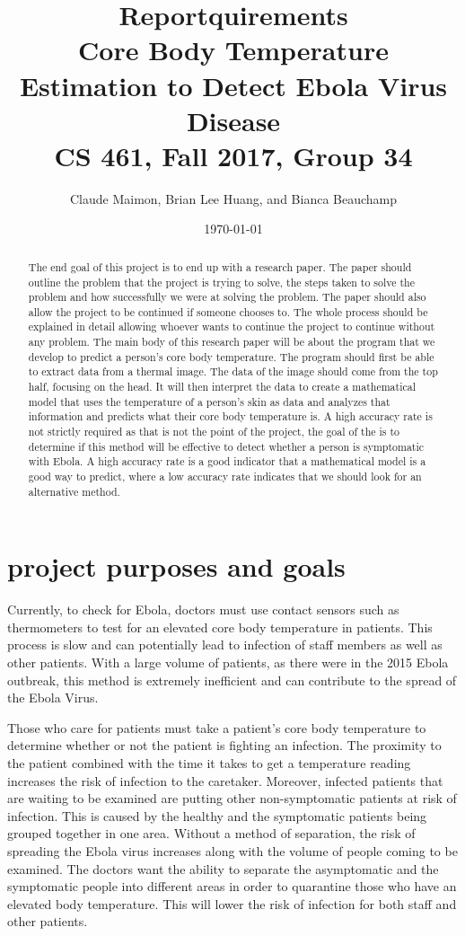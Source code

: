 \documentclass[onecolumn, draftclsnofoot,10pt, compsoc]{IEEEtran}
\title{%
  Reportquirements \\
  \vspace{0.4cm}
  \large Core Body Temperature Estimation to Detect Ebola Virus Disease \\
  \vspace{0.4cm}
  \large CS 461, Fall 2017, Group 34\\
    }
\author{Claude Maimon, Brian Lee Huang, and Bianca Beauchamp}
\date{\today}
\begin{document}
\maketitle

\begin{abstract}
	The end goal of this project is to end up with a research paper. The paper should outline the problem that the project is trying to solve, the steps taken to solve the problem and how successfully we were
	at solving the problem. The paper should also allow the project to be continued if someone chooses to. The whole process should be explained in detail allowing whoever wants to continue the
	project to continue without any problem. The main body of this research paper will be about the program that we develop to predict a person's core body temperature. The program should first be able to
	extract data from a thermal image. The data of the image should come from the top half, focusing on the head. It will then interpret the data to create a mathematical model that uses the temperature of a 
	person's skin as data and analyzes that information and predicts what their core body temperature is. A high accuracy rate is not strictly required as that is not the point of the project, 
	the goal of the is to determine if this method will be effective to detect whether a person is symptomatic with Ebola. A high accuracy rate is a good indicator that a mathematical model
	is a good way to predict, where a low accuracy rate indicates that we should look for an alternative method.
\end{abstract}

\newpage

\tableofcontents
\newpage
\section{project purposes and goals}
Currently, to check for Ebola, doctors must use contact sensors such as thermometers to test for an elevated core body temperature in patients. This process is slow and can potentially lead to infection of staff members as well as other patients. With a large volume of patients, as there were in the 2015 Ebola outbreak, this method is extremely inefficient and can contribute to the spread of the Ebola Virus.

Those who care for patients must take a patient’s core body temperature to determine whether or not the patient is fighting an infection. The proximity to the patient combined with the time it takes to get a temperature reading increases the risk of infection to the caretaker. Moreover, infected patients that are waiting to be examined are putting other non-symptomatic patients at risk of infection. This is caused by the healthy and the symptomatic patients being grouped together in one area. Without a method of separation, the risk of spreading the Ebola virus increases along with the volume of people coming to be examined. The doctors want the ability to separate the asymptomatic and the symptomatic people into different areas in order to quarantine those who have an elevated body temperature. This will lower the risk of infection for both staff and other patients.
\end{document}
